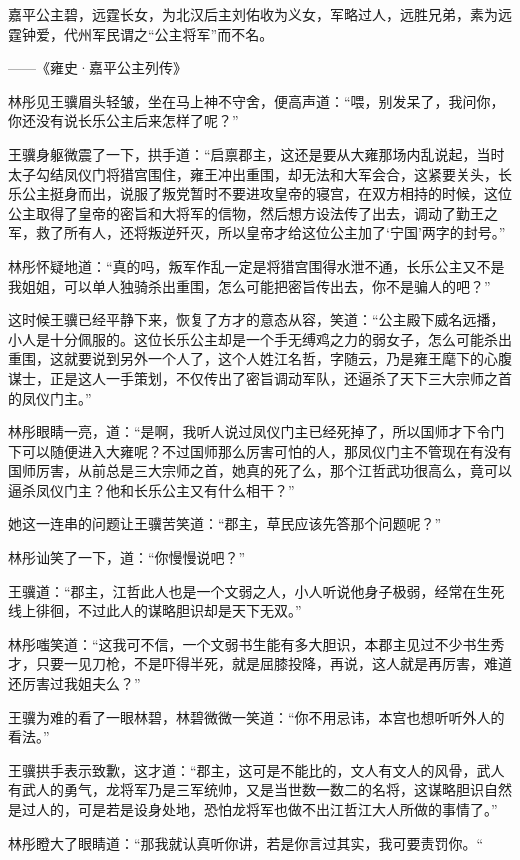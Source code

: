 嘉平公主碧，远霆长女，为北汉后主刘佑收为义女，军略过人，远胜兄弟，素为远霆钟爱，代州军民谓之“公主将军”而不名。

——《雍史·嘉平公主列传》

林彤见王骥眉头轻皱，坐在马上神不守舍，便高声道：“喂，别发呆了，我问你，你还没有说长乐公主后来怎样了呢？”

王骥身躯微震了一下，拱手道：“启禀郡主，这还是要从大雍那场内乱说起，当时太子勾结凤仪门将猎宫围住，雍王冲出重围，却无法和大军会合，这紧要关头，长乐公主挺身而出，说服了叛党暂时不要进攻皇帝的寝宫，在双方相持的时候，这位公主取得了皇帝的密旨和大将军的信物，然后想方设法传了出去，调动了勤王之军，救了所有人，还将叛逆歼灭，所以皇帝才给这位公主加了‘宁国’两字的封号。”

林彤怀疑地道：“真的吗，叛军作乱一定是将猎宫围得水泄不通，长乐公主又不是我姐姐，可以单人独骑杀出重围，怎么可能把密旨传出去，你不是骗人的吧？”

这时候王骥已经平静下来，恢复了方才的意态从容，笑道：“公主殿下威名远播，小人是十分佩服的。这位长乐公主却是一个手无缚鸡之力的弱女子，怎么可能杀出重围，这就要说到另外一个人了，这个人姓江名哲，字随云，乃是雍王麾下的心腹谋士，正是这人一手策划，不仅传出了密旨调动军队，还逼杀了天下三大宗师之首的凤仪门主。”

林彤眼睛一亮，道：“是啊，我听人说过凤仪门主已经死掉了，所以国师才下令门下可以随便进入大雍呢？不过国师那么厉害可怕的人，那凤仪门主不管现在有没有国师厉害，从前总是三大宗师之首，她真的死了么，那个江哲武功很高么，竟可以逼杀凤仪门主？他和长乐公主又有什么相干？”

她这一连串的问题让王骥苦笑道：“郡主，草民应该先答那个问题呢？”

林彤讪笑了一下，道：“你慢慢说吧？”

王骥道：“郡主，江哲此人也是一个文弱之人，小人听说他身子极弱，经常在生死线上徘徊，不过此人的谋略胆识却是天下无双。”

林彤嗤笑道：“这我可不信，一个文弱书生能有多大胆识，本郡主见过不少书生秀才，只要一见刀枪，不是吓得半死，就是屈膝投降，再说，这人就是再厉害，难道还厉害过我姐夫么？”

王骥为难的看了一眼林碧，林碧微微一笑道：“你不用忌讳，本宫也想听听外人的看法。”

王骥拱手表示致歉，这才道：“郡主，这可是不能比的，文人有文人的风骨，武人有武人的勇气，龙将军乃是三军统帅，又是当世数一数二的名将，这谋略胆识自然是过人的，可是若是设身处地，恐怕龙将军也做不出江哲江大人所做的事情了。”

林彤瞪大了眼睛道：“那我就认真听你讲，若是你言过其实，我可要责罚你。“


